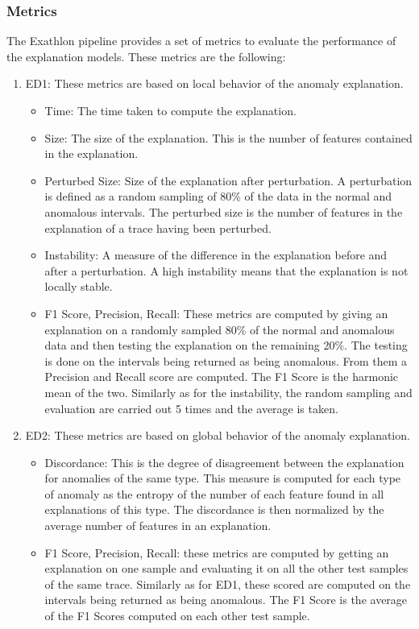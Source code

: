 \documentclass[oneside, a4paper, onecolumn, 11pt]{article}
\begin{document}
\subsubsection{Metrics}
The Exathlon pipeline provides a set of metrics to evaluate the performance of the explanation models. These metrics are the following:
\begin{enumerate}
  \item ED1: These metrics are based on local behavior of the anomaly explanation.
  \begin{itemize}
    \item Time: The time taken to compute the explanation.
    \item Size: The size of the explanation. This is the number of features contained in the explanation.
    \item Perturbed Size: Size of the explanation after perturbation. A perturbation is defined as a random sampling of 80\% of the data in the normal and anomalous intervals. The perturbed size is the number of features in the explanation of a trace having been perturbed.
    \item Instability: A measure of the difference in the explanation before and after a perturbation. A high instability means that the explanation is not locally stable.
    \item F1 Score, Precision, Recall: These metrics are computed by giving an explanation on a randomly sampled 80\% of the normal and anomalous data and then testing the explanation on the remaining 20\%. The testing is done on the intervals being returned as being anomalous. From them a Precision and Recall score are computed. The F1 Score is the harmonic mean of the two. Similarly as for the instability, the random sampling and evaluation are carried out 5 times and the average is taken.
  \end{itemize}
  \item ED2: These metrics are based on global behavior of the anomaly explanation.
  \begin{itemize}
    \item Discordance: This is the degree of disagreement between the explanation for anomalies of the same type. This measure is computed for each type of anomaly as the entropy of the number of each feature found in all explanations of this type. The discordance is then normalized by the average number of features in an explanation.
    \item F1 Score, Precision, Recall: these metrics are computed by getting an explanation on one sample and evaluating it on all the other test samples of the same trace. Similarly as for ED1, these scored are computed on the intervals being returned as being anomalous. The F1 Score is the average of the F1 Scores computed on each other test sample.
  \end{itemize}
\end{enumerate}
\end{document}
